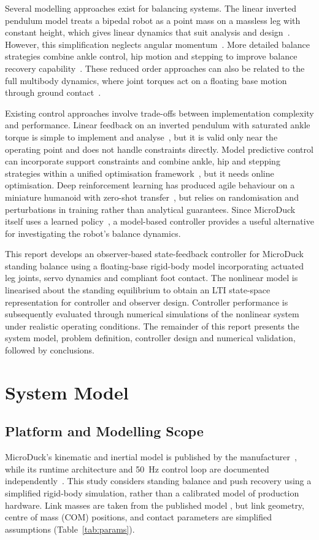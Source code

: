 \documentclass[conference,a4paper]{IEEEtran}
\begin{document}
Several modelling approaches exist for balancing systems. The linear inverted pendulum model treats a bipedal robot as a point mass on a massless leg with constant height, which gives linear dynamics that suit analysis and design~\cite{kajita2001}. However, this simplification neglects angular momentum~\cite{stephens2007}. More detailed balance strategies combine ankle control, hip motion and stepping to improve balance recovery capability~\cite{stephens2007,aftab2012}. These reduced order approaches can also be related to the full multibody dynamics, where joint torques act on a floating base motion through ground contact~\cite{tedrake_multibody}.

Existing control approaches involve trade-offs between implementation complexity and performance. Linear feedback on an inverted pendulum with saturated ankle torque is simple to implement and analyse~\cite{stephens2007}, but it is valid only near the operating point and does not handle constraints directly. Model predictive control can incorporate support constraints and combine ankle, hip and stepping strategies within a unified optimisation framework~\cite{aftab2012}, but it needs online optimisation. Deep reinforcement learning has produced agile behaviour on a miniature humanoid with zero-shot transfer~\cite{haarnoja2024}, but relies on randomisation and perturbations in training rather than analytical guarantees. Since MicroDuck itself uses a learned policy~\cite{openmicroduck_params}, a model-based controller provides a useful alternative for investigating the robot's balance dynamics.

This report develops an observer-based state-feedback controller for MicroDuck standing balance using a floating-base rigid-body model incorporating actuated leg joints, servo dynamics and compliant foot contact. The nonlinear model is linearised about the standing equilibrium to obtain an LTI state-space representation for controller and observer design. Controller performance is subsequently evaluated through numerical simulations of the nonlinear system under realistic operating conditions. The remainder of this report presents the system model, problem definition, controller design and numerical validation, followed by conclusions.



\section{System Model}
\subsection{Platform and Modelling Scope}
MicroDuck's kinematic and inertial model is published by the manufacturer~\cite{pollen_mjcf}, while its runtime architecture and 50~Hz control loop are documented independently~\cite{openmicroduck,openmicroduck_params}. This study considers standing balance and push recovery using a simplified rigid-body simulation, rather than a calibrated model of production hardware. Link masses are taken from the published model \cite{pollen_mjcf}, but link geometry, centre of mass (COM) positions, and contact parameters are simplified assumptions (Table~\ref{tab:params}). 
\end{document}
